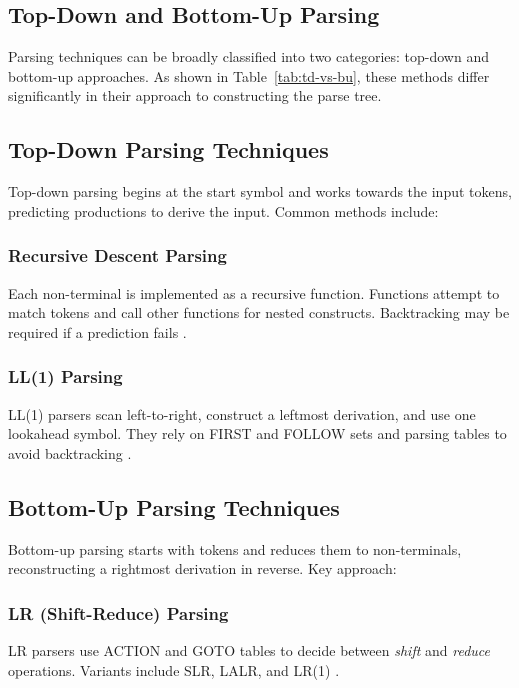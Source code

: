 \subsection{Top-Down and Bottom-Up Parsing}

Parsing techniques can be broadly classified into two categories: top-down and bottom-up approaches. As shown in Table~\ref{tab:td-vs-bu}, these methods differ significantly in their approach to constructing the parse tree.

\subsection{Top-Down Parsing Techniques}

Top-down parsing begins at the start symbol and works towards the input tokens, predicting productions to derive the input. Common methods include:

\subsubsection*{Recursive Descent Parsing}
Each non-terminal is implemented as a recursive function. Functions attempt to match tokens and call other functions for nested constructs. Backtracking may be required if a prediction fails \cite{aho2007compilers}.

\subsubsection*{LL(1) Parsing}
LL(1) parsers scan left-to-right, construct a leftmost derivation, and use one lookahead symbol. They rely on FIRST and FOLLOW sets and parsing tables to avoid backtracking \cite{aho2007compilers}.

\subsection{Bottom-Up Parsing Techniques}

Bottom-up parsing starts with tokens and reduces them to non-terminals, reconstructing a rightmost derivation in reverse. Key approach:

\subsubsection*{LR (Shift-Reduce) Parsing}
LR parsers use ACTION and GOTO tables to decide between \textit{shift} and \textit{reduce} operations. Variants include SLR, LALR, and LR(1) \cite{aho2007compilers}.

